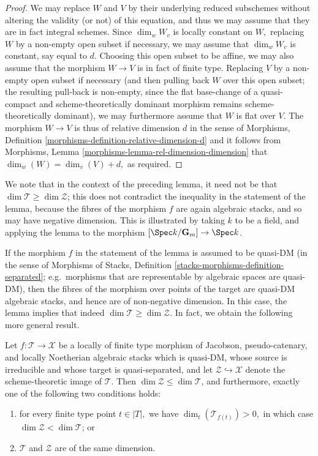 \begin{proof}
\medskip\noindent
We may replace $W$ and $V$ by their underlying reduced subschemes
without altering the validity (or not) of this equation,
and thus we may assume that they are in fact integral schemes.
Since $\dim_w W_v$ is locally constant on $W,$ replacing $W$
by a non-empty open subset if necessary, we may assume that $\dim_w W_v$
is constant, say equal to $d$.  Choosing this open subset to be affine,
we may also assume that the morphism $W\to V$ is in fact of finite type.
Replacing $V$ by a non-empty open subset if necessary
(and then pulling back $W$ over this open subset; the resulting pull-back
is non-empty, since the flat base-change of a quasi-compact
and scheme-theoretically
dominant morphism remains scheme-theoretically dominant),
we may furthermore assume that $W$ is flat over $V$.
The morphism $W\to V$ is thus of relative dimension $d$
in the sense of
Morphisms, Definition
\ref{morphisms-definition-relative-dimension-d}
and it follows from
Morphisms, Lemma \ref{morphisms-lemma-rel-dimension-dimension}
that $\dim_w(W) = \dim_v(V) + d,$ as required.
\end{proof}

\begin{remark}
\label{remark-negative-dimension}
We note that in the context of the preceding lemma,
it need not be that $\dim \mathcal{T} \geq \dim \mathcal{Z}$; this does
not contradict the inequality in the statement of the lemma, because
the fibres of the morphism $f$ are again algebraic stacks, and
so may have negative dimension.  This is illustrated by taking
$k$ to be a field, and applying the lemma to the morphism
$[\Spec k/\mathbf{G}_m] \to \Spec k$.

\medskip\noindent
If the morphism $f$ in the statement of the lemma is assumed
to be quasi-DM (in the sense of
Morphisms of Stacks, Definition
\ref{stacks-morphisms-definition-separated}; e.g.\ morphisms that are
representable by algebraic spaces are quasi-DM),
then the fibres of the morphism over points of the target
are quasi-DM algebraic stacks, and hence are of non-negative
dimension.  In this case, the lemma implies
that indeed $\dim \mathcal{T} \geq \dim \mathcal{Z}$.  In fact, we obtain
the following more general result.
\end{remark}

\begin{lemma}
\label{lemma-dims-of-images-two}
Let $f: \mathcal{T} \to \mathcal{X}$ be a locally of finite type
morphism of Jacobson, pseudo-catenary, and locally Noetherian
algebraic stacks
which is quasi-DM,
whose source is irreducible and whose target is quasi-separated,
and let $\mathcal{Z} \hookrightarrow \mathcal{X}$ denote the scheme-theoretic
image of $\mathcal{T}$.
Then $\dim \mathcal{Z} \leq \dim \mathcal{T}$,
and furthermore, exactly one of the following two conditions holds:
\begin{enumerate}
\item for every finite type point $t \in |T|,$
we have
$\dim_t(\mathcal{T}_{f(t)}) > 0,$ in which
case $\dim \mathcal{Z} < \dim \mathcal{T}$; or
\item   $\mathcal{T}$ and $\mathcal{Z}$
are of the same dimension.
\end{enumerate}
\end{lemma}

